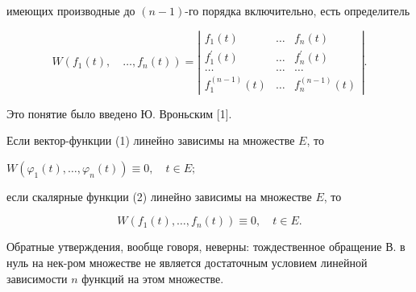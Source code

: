 \documentclass[10pt]{article}
\begin{document}
имеющих производные до $(n-1)$-го порядка включительно, есть определитель



\[

W\left(f_{1}(t), \quad \ldots, f_{n}(t)\right)=\left|\begin{array}{lll}

f_{1}(t) & \ldots & f_{n}(t) \\

f_{1}^{\prime}(t) & \ldots & f_{n}^{\prime}(t) \\

\ldots & \ldots & \ldots \\

f_{1}^{(n-1)}(t) & \ldots & f_{n}^{(n-1)}(t)

\end{array}\right| .

\]



Это понятие было введено Ю. Вроньским [1].



Если вектор-функции (1) линейно зависимы на множестве $E$, то



$W\left(\varphi_{1}(t), \ldots, \varphi_{n}(t)\right) \equiv 0, \quad t \in E ;$



если скалярные функции (2) линейно зависимы на множестве $E$, то



\[

W\left(f_{1}(t), \ldots, f_{n}(t)\right) \equiv 0, \quad t \in E .

\]



Обратные утверждения, вообще говоря, неверны: тождественное обращение В. в нуль на нек-ром множестве не является достаточным условием линейной зависимости $n$ функций на этом множестве.
\end{document}
